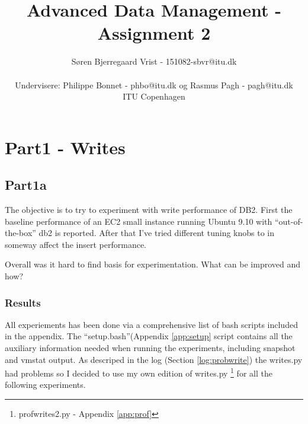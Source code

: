 
\title{Advanced Data Management - Assignment 2}
\author{S\o ren Bjerregaard Vrist - 151082-sbvr@itu.dk\\ \\Undervisere: Philippe
Bonnet - phbo@itu.dk og
Rasmus Pagh - pagh@itu.dk\\ITU Copenhagen}



\maketitle
\newpage
\chapter{Part1 - Writes}
\section{Part1a}
The objective is to try to experiment with write performance of DB2. 
First the baseline performance of an EC2 small instance running Ubuntu 9.10 with
``out-of-the-box'' db2 is reported. After that I've tried different tuning knobs
to in someway affect the insert performance.

Overall was it hard to find basis for experimentation. What can be improved and
how? 

\subsection{Results}
All experiements has been done via a comprehensive list of bash scripts included
in the appendix. The ``setup.bash''(Appendix \ref{app:setup} script contains all the auxiliary
information needed when running the experiments, including snapshot and vmstat
output. As descriped in the log (Section \ref{log:probwrite}) the writes.py had
problems so I decided to use my own edition of writes.py \footnote{profwrites2.py -
Appendix \ref{app:prof}} for all the following experiments.


